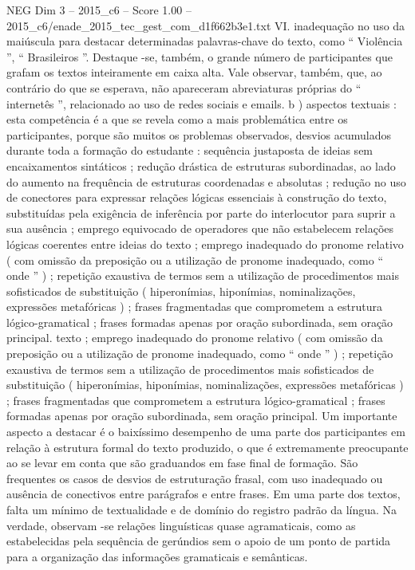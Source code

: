 \begin{textsample}{NEG Dim 3 – 2015\_c6 – Score 1.00 – 2015\_c6/enade\_2015\_tec\_gest\_com\_d1f662b3e1.txt}
VI. inadequação no uso da maiúscula para destacar determinadas palavras-chave do texto, como “ Violência ”, “ Brasileiros ”.
Destaque -se, também, o grande número de participantes que grafam os textos inteiramente em caixa alta.
Vale observar, também, que, ao contrário do que se esperava, não apareceram abreviaturas próprias do “ internetês ”, relacionado ao uso de redes sociais e emails. b ) aspectos textuais : esta competência é a que se revela como a mais problemática entre os participantes, porque são muitos os problemas observados, desvios acumulados durante toda a formação do estudante : sequência justaposta de ideias sem encaixamentos sintáticos ; redução drástica de estruturas subordinadas, ao lado do aumento na frequência de estruturas coordenadas e absolutas ; redução no uso de conectores para expressar relações lógicas essenciais à construção do texto, substituídas pela exigência de inferência por parte do interlocutor para suprir a sua ausência ; emprego equivocado de operadores que não estabelecem relações lógicas coerentes entre ideias do texto ; emprego inadequado do pronome relativo ( com omissão da preposição ou a utilização de pronome inadequado, como “ onde ” ) ; repetição exaustiva de termos sem a utilização de procedimentos mais sofisticados de substituição ( hiperonímias, hiponímias, nominalizações, expressões metafóricas ) ; frases fragmentadas que comprometem a estrutura lógico-gramatical ; frases formadas apenas por oração subordinada, sem oração principal. texto ; emprego inadequado do pronome relativo ( com omissão da preposição ou a utilização de pronome inadequado, como “ onde ” ) ; repetição exaustiva de termos sem a utilização de procedimentos mais sofisticados de substituição ( hiperonímias, hiponímias, nominalizações, expressões metafóricas ) ; frases fragmentadas que comprometem a estrutura lógico-gramatical ; frases formadas apenas por oração subordinada, sem oração principal.
Um importante aspecto a destacar é o baixíssimo desempenho de uma parte dos participantes em relação à estrutura formal do texto produzido, o que é extremamente preocupante ao se levar em conta que são graduandos em fase final de formação.
São frequentes os casos de desvios de estruturação frasal, com uso inadequado ou ausência de conectivos entre parágrafos e entre frases.
Em uma parte dos textos, falta um mínimo de textualidade e de domínio do registro padrão da língua.
Na verdade, observam -se relações linguísticas quase agramaticais, como as estabelecidas pela sequência de gerúndios sem o apoio de um ponto de partida para a organização das informações gramaticais e semânticas.

\end{textsample}
